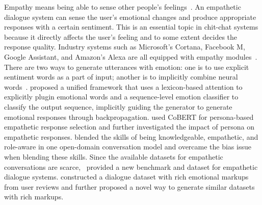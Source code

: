 \label{Empathetic Response}
Empathy means being able to sense other people's feelings~. An empathetic dialogue system can sense the user's emotional changes and produce appropriate responses with a certain sentiment. This is an essential topic in chit-chat systems because it directly affects the user's feeling and to some extent decides the response quality. Industry systems such as Microsoft's Cortana, Facebook M, Google Assistant, and Amazon's Alexa are all equipped with empathy modules~. 
There are two ways to generate utterances with emotion: one is to use explicit sentiment words as a part of input; another is to implicitly combine neural words~.  proposed a unified framework that uses a lexicon-based attention to explicitly plugin emotional words and a sequence-level emotion classifier to classify the output sequence, implicitly guiding the generator to generate emotional responses through backpropagation.  used CoBERT for persona-based empathetic response selection and further investigated the impact of persona on empathetic responses.  blended the skills of being knowledgeable, empathetic, and role-aware in one open-domain conversation model and overcame the bias issue when blending these skills. 
Since the available datasets for empathetic conversations are scarce,~ provided a new benchmark and dataset for empathetic dialogue systems.  constructed a dialogue dataset with rich emotional markups from user reviews and further proposed a novel way to generate similar datasets with rich markups.

